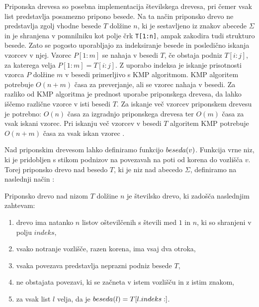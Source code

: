 Priponska drevesa so posebna implementacija številskega drevesa, pri čemer vsak list predstavlja posamezno pripono besede. Na ta način priponsko drevo ne predstavlja zgolj vhodne besede $T$ dolžine $n$, ki je sestavljeno iz znakov abecede $\Sigma$ in je shranjena v pomnilniku kot polje črk \texttt{T[1:n]}, ampak zakodira tudi strukturo besede. Zato se pogosto uporabljajo za indeksiranje besede in posledično iskanja vzorcev v njej. Vzorec $P[1:m]$ se nahaja v besedi $T$, če obstaja podniz $T[i:j]$, za katerega velja $P[1:m]=T[i:j]$. Z uporabo indeksa je iskanje prisotnosti vzorca $P$ dolžine $m$ v besedi primerljivo s KMP algoritmom. KMP algoritem potrebuje $O(n+m)$ časa za preverjanje, ali se vzorec nahaja v besedi. Za razliko od KMP algoritma je prednost uporabe priponskega drevesa, da lahko iščemo različne vzorce v isti besedi $T$. Za iskanje več vzorcev priponskem drevesu je potrebno: $O(n)$ časa za izgradnjo priponskega drevesa ter $O(m)$ časa za vsak iskani vzorec. Pri iskanju več vzorcev v besedi $T$ algoritem KMP potrebuje $O(n+m)$ časa za vsak iskan vzorec \cite{Gusfield1997,KMP}.


%
Nad priponskim drevesom lahko definiramo funkcijo $ \mathop{beseda}(v)$. Funkcija vrne niz, ki je pridobljen s stikom podnizov na povezavah na poti od korena do vozlišča $v$.
Torej priponsko drevo nad besedo $T$, ki je niz nad abecedo $\Sigma$, definiramo na naslednji način \cite{Gusfield1997}:

\begin{defi}\label{def:priposkoDrevo}
    Priponsko drevo nad nizom $T$ dolžine $n$ je številsko drevo, ki zadošča naslednjim zahtevam:
    \begin{enumerate}
        \item drevo ima natanko $n$ listov oštevilčenih s števili med $1$ in $n$, ki so shranjeni v polju $indeks$,
        \item vsako notranje vozlišče, razen korena, ima vsaj dva otroka,
        \item vsaka povezava predstavlja neprazni podniz besede $T$,
        \item ne obstajata %
        povezavi, ki se začneta v istem vozlišču in z istim znakom,
        \item za vsak list $l$ velja, da je $ \mathop{beseda}(l)=T[l.indeks:]$.        
    \end{enumerate}
\end{defi}




